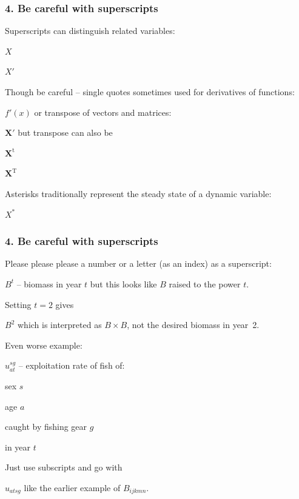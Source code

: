 

\begin{frame}
\frametitle{4. Be careful with superscripts}

Superscripts can distinguish related variables:
\bi
  \item $X$
  \item $X'$
\ei

Though be careful -- single quotes sometimes used for derivatives of functions:
\bi
\item $f'(x)$
\ei
or transpose of vectors and matrices:
\bi
\item $\mathbf{X}'$
\ei
but transpose can also be
\bi
  \item $\mathbf{X}^{\mbox{t}}$
  \item $\mathbf{X}^{\mbox{T}}$
\ei

Asterisks traditionally represent the steady state of a dynamic variable:
\bi
  \item $X^*$
\ei

\end{frame}


\begin{frame}
\frametitle{4. Be careful with superscripts}

Please please please  a number or a letter (as an index) as a
superscript:
\bi
  \item $B^t$ -- biomass in year $t$
\ei
but this looks like $B$ raised to the power $t$.

Setting $t=2$ gives
\bi
  \item $B^2$
\ei
which is interpreted as $B \times B$, not the desired biomass in year~2.

\pause

Even worse example:
\bi
  \item $u_{at}^{sg}$ -- exploitation rate of fish of:
  \bi
    \item sex $s$
    \item age $a$
    \item caught by fishing gear $g$
    \item in year $t$
  \ei
\ei

Just use subscripts and go with
\bi
  \item $u_{atsg}$
\ei
like the earlier example of $B_{ijkmn}$.
\end{frame}

